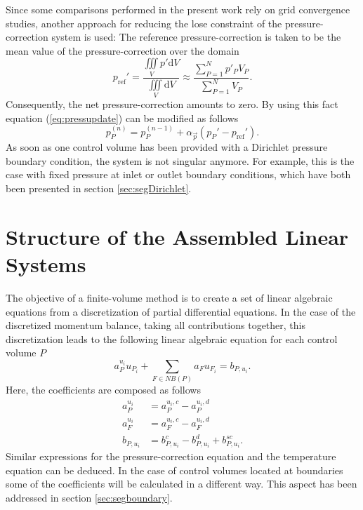 Since some comparisons performed in the present work rely on grid convergence studies, another approach for reducing the lose constraint of the pressure-correction system is used: The reference pressure-correction is taken to be the mean value of the pressure-correction over the domain 
\begin{displaymath}
  p_{\text{ref}}' 
  = \frac{\iiint\limits_V p' \mathrm{d}V}{\iiint\limits_V \mathrm{d}V} 
    \approx \frac{\sum_{P = 1}^N p'_P V_P}{\sum_{P = 1}^N V_P}.
\end{displaymath}
Consequently, the net pressure-correction amounts to zero. By using this fact equation (\ref{eq:pressupdate}) can be modified as follows
\begin{displaymath}
  p_P^{(n)} = p_P^{(n-1)} + \alpha_{\vec{p}} \left( p_P' - p_{\text{ref}}' \right).
\end{displaymath}
As soon as one control volume has been provided with a Dirichlet pressure boundary condition, the system is not singular anymore. For example, this is the case with fixed pressure at inlet or outlet boundary conditions, which have both been presented in section \ref{sec:segDirichlet}.

\section{Structure of the Assembled Linear Systems}
\label{sec:structure}

The objective of a finite-volume method is to create a set of linear algebraic equations from a discretization of partial differential equations. In the case of the discretized momentum balance, taking all contributions together, this discretization leads to the following linear algebraic equation for each control volume \(P\)
\begin{displaymath}
  a_P^{u_i} u_{P_i} + \sum_{F \in NB(P)} a_F u_{F_i} = b_{P,u_i}.
\end{displaymath}
Here, the coefficients are composed as follows
\begin{align*}
  a_P^{u_i} &= a_P^{u_i,c} - a_P^{u_i,d} \\
  a_F^{u_i} &= a_F^{u_i,c} - a_F^{u_i,d} \\
  b_{P,u_i} &= b_{P,u_i}^{c} - b_{P,u_i}^{d} + b_{P,u_i}^{sc}.
\end{align*}
Similar expressions for the pressure-correction equation and the temperature equation can be deduced. In the case of control volumes located at boundaries some of the coefficients will be calculated in a different way. This aspect has been addressed in section \ref{sec:segboundary}.

